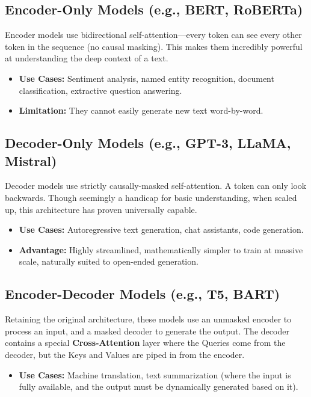 \documentclass[11pt, a4paper]{article}
\begin{document}
\subsection{Encoder-Only Models (e.g., BERT, RoBERTa)}
Encoder models use bidirectional self-attention—every token can see every other token in the sequence (no causal masking). This makes them incredibly powerful at understanding the deep context of a text.
\begin{itemize}
    \item \textbf{Use Cases:} Sentiment analysis, named entity recognition, document classification, extractive question answering.
    \item \textbf{Limitation:} They cannot easily generate new text word-by-word.
\end{itemize}

\subsection{Decoder-Only Models (e.g., GPT-3, LLaMA, Mistral)}
Decoder models use strictly causally-masked self-attention. A token can only look backwards. Though seemingly a handicap for basic understanding, when scaled up, this architecture has proven universally capable.
\begin{itemize}
    \item \textbf{Use Cases:} Autoregressive text generation, chat assistants, code generation.
    \item \textbf{Advantage:} Highly streamlined, mathematically simpler to train at massive scale, naturally suited to open-ended generation.
\end{itemize}

\subsection{Encoder-Decoder Models (e.g., T5, BART)}
Retaining the original architecture, these models use an unmasked encoder to process an input, and a masked decoder to generate the output. The decoder contains a special \textbf{Cross-Attention} layer where the Queries come from the decoder, but the Keys and Values are piped in from the encoder.
\begin{itemize}
    \item \textbf{Use Cases:} Machine translation, text summarization (where the input is fully available, and the output must be dynamically generated based on it).
\end{itemize}
\end{document}
